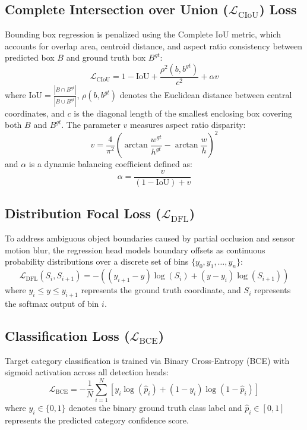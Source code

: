 \subsection{Complete Intersection over Union ($\mathcal{L}_{\text{CIoU}}$) Loss}
Bounding box regression is penalized using the Complete IoU metric, which accounts for overlap area, centroid distance, and aspect ratio consistency between predicted box $B$ and ground truth box $B^{gt}$:
\begin{equation}
    \mathcal{L}_{\text{CIoU}} = 1 - \text{IoU} + \frac{\rho^2(b, b^{gt})}{c^2} + \alpha v
\end{equation}
where $\text{IoU} = \frac{|B \cap B^{gt}|}{|B \cup B^{gt}|}$, $\rho(b, b^{gt})$ denotes the Euclidean distance between central coordinates, and $c$ is the diagonal length of the smallest enclosing box covering both $B$ and $B^{gt}$. The parameter $v$ measures aspect ratio disparity:
\begin{equation}
    v = \frac{4}{\pi^2} \left( \arctan\frac{w^{gt}}{h^{gt}} - \arctan\frac{w}{h} \right)^2
\end{equation}
and $\alpha$ is a dynamic balancing coefficient defined as:
\begin{equation}
    \alpha = \frac{v}{(1 - \text{IoU}) + v}
\end{equation}

\subsection{Distribution Focal Loss ($\mathcal{L}_{\text{DFL}}$)}
To address ambiguous object boundaries caused by partial occlusion and sensor motion blur, the regression head models boundary offsets as continuous probability distributions over a discrete set of bins $\{y_0, y_1, \dots, y_n\}$:
\begin{equation}
    \mathcal{L}_{\text{DFL}}(S_i, S_{i+1}) = - \left( (y_{i+1} - y) \log(S_i) + (y - y_i) \log(S_{i+1}) \right)
\end{equation}
where $y_i \le y \le y_{i+1}$ represents the ground truth coordinate, and $S_i$ represents the softmax output of bin $i$.

\subsection{Classification Loss ($\mathcal{L}_{\text{BCE}}$)}
Target category classification is trained via Binary Cross-Entropy (BCE) with sigmoid activation across all detection heads:
\begin{equation}
    \mathcal{L}_{\text{BCE}} = - \frac{1}{N} \sum_{i=1}^N \left[ y_i \log(\hat{p}_i) + (1 - y_i) \log(1 - \hat{p}_i) \right]
\end{equation}
where $y_i \in \{0, 1\}$ denotes the binary ground truth class label and $\hat{p}_i \in [0, 1]$ represents the predicted category confidence score.

